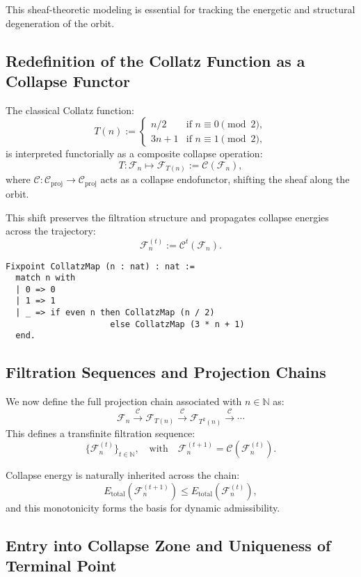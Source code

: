 \documentclass[11pt]{article}
\begin{document}
This sheaf-theoretic modeling is essential for tracking the energetic and structural degeneration of the orbit.

\subsection{Redefinition of the Collatz Function as a Collapse Functor}

The classical Collatz function:
\[
T(n) := \begin{cases}
n/2 & \text{if } n \equiv 0 \pmod{2}, \\
3n + 1 & \text{if } n \equiv 1 \pmod{2},
\end{cases}
\]
is interpreted functorially as a composite collapse operation:
\[
T : \mathcal{F}_n \mapsto \mathcal{F}_{T(n)} := \mathcal{C}(\mathcal{F}_n),
\]
where \( \mathcal{C} : \mathcal{C}_{\mathrm{proj}} \to \mathcal{C}_{\mathrm{proj}} \) acts as a collapse endofunctor, shifting the sheaf along the orbit.

This shift preserves the filtration structure and propagates collapse energies across the trajectory:
\[
\mathcal{F}_{n}^{(t)} := \mathcal{C}^t(\mathcal{F}_n).
\]

\begin{lstlisting}[language=Coq]
Fixpoint CollatzMap (n : nat) : nat :=
  match n with
  | 0 => 0
  | 1 => 1
  | _ => if even n then CollatzMap (n / 2)
                     else CollatzMap (3 * n + 1)
  end.
\end{lstlisting}

\subsection{Filtration Sequences and Projection Chains}

We now define the full projection chain associated with \( n \in \mathbb{N} \) as:
\[
\mathcal{F}_n \xrightarrow{\mathcal{C}} \mathcal{F}_{T(n)} \xrightarrow{\mathcal{C}} \mathcal{F}_{T^2(n)} \xrightarrow{\mathcal{C}} \cdots
\]
This defines a transfinite filtration sequence:
\[
\{ \mathcal{F}_n^{(t)} \}_{t \in \mathbb{N}}, \quad \text{with} \quad \mathcal{F}_n^{(t+1)} = \mathcal{C}(\mathcal{F}_n^{(t)}).
\]

Collapse energy is naturally inherited across the chain:
\[
E_{\mathrm{total}}(\mathcal{F}_n^{(t+1)}) \leq E_{\mathrm{total}}(\mathcal{F}_n^{(t)}),
\]
and this monotonicity forms the basis for dynamic admissibility.

\subsection{Entry into Collapse Zone and Uniqueness of Terminal Point}
\end{document}

